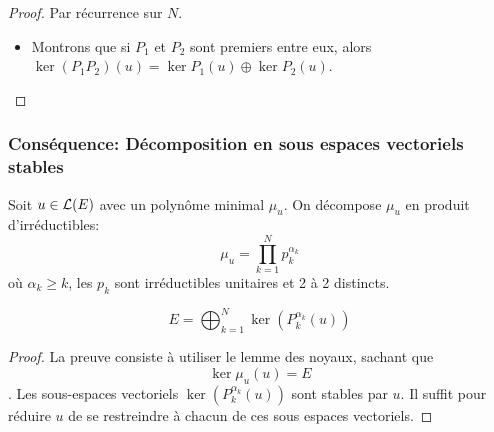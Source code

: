 \begin{proof}
	Par récurrence sur $N$.

	\begin{itemize}
		\item Montrons que si $P_1$ et $P_2$ sont premiers entre eux, alors $\ker (P_1P_2) (u) = \ker P_1(u) \oplus \ker P_2(u)$.\\
	\end{itemize}
\end{proof}


\subsubsection{Conséquence: Décomposition en sous espaces vectoriels stables}


Soit $u \in \mathcal{L}(E)$ avec un polynôme minimal $\mu_u$. On décompose $\mu_u$ en produit
d'irréductibles:
$$ \mu_u = \prod\limits_{k=1}^N p_k^{\alpha_k} $$
où $\alpha_k \geq k$, les $p_k$ sont irréductibles unitaires et 2 à 2 distincts.


\begin{coro}
	$$E = \bigoplus_{k=1}^N \ker\left( {P_k^{\alpha_k}(u)} \right)$$
\end{coro}

\begin{proof}
	La preuve consiste à utiliser le lemme des noyaux, sachant que
	$$\ker \mu_u(u) = E $$.
    Les sous-espaces vectoriels  $\ker\left( {P_k^{\alpha_k}(u)} \right)$ sont stables par $u$.
	Il suffit pour réduire $u$ de se restreindre à chacun de ces sous espaces vectoriels.
\end{proof}

